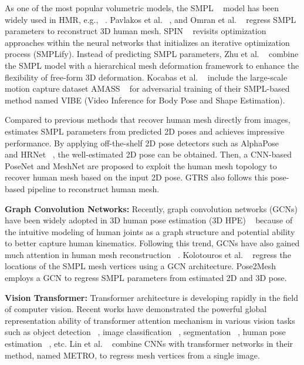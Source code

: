 \documentclass[sigconf]{acmart}
\begin{document}
As one of the most popular volumetric models, the SMPL  ~\cite{SMPL:2015} model has been widely used in HMR, e.g., ~\cite{Bogo:ECCV:2016,kanazawaHMR18,Jiang_2020_CVPR,xu2020Low_Resolution}. 
Pavlakos et al. ~\cite{pavlakos2018humanshape}, and Omran et al. ~\cite{omran2018nbf} regress SMPL parameters to reconstruct 3D human mesh. SPIN ~\cite{Kolotouros2019SPIN} revisits optimization approaches within the neural networks that initializes an iterative optimization process (SMPLify). Instead of predicting SMPL parameters, Zhu et al. ~\cite{zhu2019detailed} combine the SMPL model with a hierarchical mesh deformation framework to enhance the flexibility of free-form 3D deformation. Kocabas et al. ~\cite{kocabas2020vibe} include the large-scale motion capture dataset AMASS ~\cite{AMASS2019} for adversarial training of their SMPL-based method named VIBE (Video Inference for Body Pose and Shape Estimation). 

Compared to previous methods that recover human mesh directly from images, ~\cite{Choi_2020_ECCV_Pose2Mesh} estimates SMPL parameters from predicted 2D poses and achieves impressive performance. 
By applying off-the-shelf 2D pose detectors such as AlphaPose ~\cite{fang2017rmpe} and HRNet ~\cite{sun2019deep}, the well-estimated 2D pose can be obtained. Then, a CNN-based PoseNet and MeshNet are proposed to exploit the human mesh topology to recover human mesh based on the input 2D pose. GTRS also follows this pose-based pipeline to reconstruct human mesh. 


\textbf{Graph Convolution Networks:} Recently, graph convolution networks (GCNs) have been widely adopted in 3D human pose estimation (3D HPE) ~\cite{Ci2019,Zhao_2019_Semantic_Graph,Liu_2020_ECCV_weight_sharing,MGCN_2021_ICCV,zhao2021graformer} because of the intuitive modeling of human joints as a graph structure and potential ability to better capture human kinematics.
Following this trend,
GCNs have also gained much attention in human mesh reconstruction ~\cite{kolotouros2019cmr,Choi_2020_ECCV_Pose2Mesh,Graphormer_2021_ICCV}. Kolotouros et al. ~\cite{kolotouros2019cmr} regress the locations of the SMPL mesh vertices using a GCN architecture. Pose2Mesh ~\cite{Choi_2020_ECCV_Pose2Mesh} employs a GCN to regress SMPL parameters from estimated 2D and 3D pose. 


\textbf{Vision Transformer:} Transformer architecture is developing rapidly in the field of computer vision. Recent works have demonstrated the powerful global representation ability of transformer attention mechanism in various vision tasks such as object detection ~\cite{carion2020end,zhu2020deformable}, image classification ~\cite{Dosovitskiy2020ViT,liu2021Swin}, segmentation ~\cite{zheng2021rethinking}, human pose estimation ~\cite{Poseformer_2021_ICCV,zhao2021graformer}, 
etc.  Lin et al. ~\cite{lin2021metro} combine CNNs with transformer networks in their method, named METRO, to regress mesh vertices from a single image. 
\end{document}
